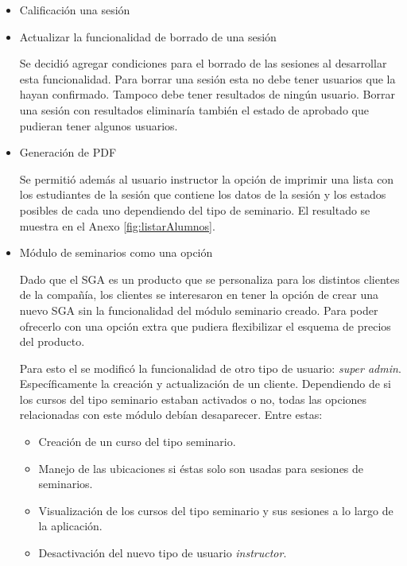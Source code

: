 \begin{itemize}

\item Calificación una sesión


\item Actualizar la funcionalidad de borrado de una sesión

Se decidió agregar condiciones para el borrado de las sesiones al desarrollar esta funcionalidad. Para borrar una sesión esta no debe tener usuarios que la hayan confirmado. Tampoco debe tener resultados de ningún usuario. Borrar una sesión con resultados eliminaría también el estado de aprobado que pudieran tener algunos usuarios.

\item Generación de PDF

Se permitió además al usuario instructor la opción de imprimir una lista con los estudiantes de la sesión que contiene los datos de la sesión y los estados posibles de cada uno dependiendo del tipo de seminario. El resultado se muestra en el Anexo \ref{fig:listarAlumnos}.


\item Módulo de seminarios como una opción

Dado que el SGA es un producto que se personaliza para los distintos clientes de la compañía, los clientes se interesaron en tener la opción de crear una nuevo SGA sin la funcionalidad del módulo seminario creado. Para poder ofrecerlo con una opción extra que pudiera flexibilizar el esquema de precios del producto.

Para esto el se modificó la funcionalidad de otro tipo de usuario: \emph{super admin}. Específicamente la creación y actualización de un cliente. Dependiendo de si los cursos del tipo seminario estaban activados o no, todas las opciones relacionadas con este módulo debían desaparecer. Entre estas:

\begin{itemize}
	\item Creación de un curso del tipo seminario.
	\item Manejo de las ubicaciones si éstas solo son usadas para sesiones de seminarios.
	\item Visualización de los cursos del tipo seminario y sus sesiones a lo largo de la aplicación.
	\item Desactivación del nuevo tipo de usuario \emph{instructor}.
\end{itemize}

\end{itemize}


